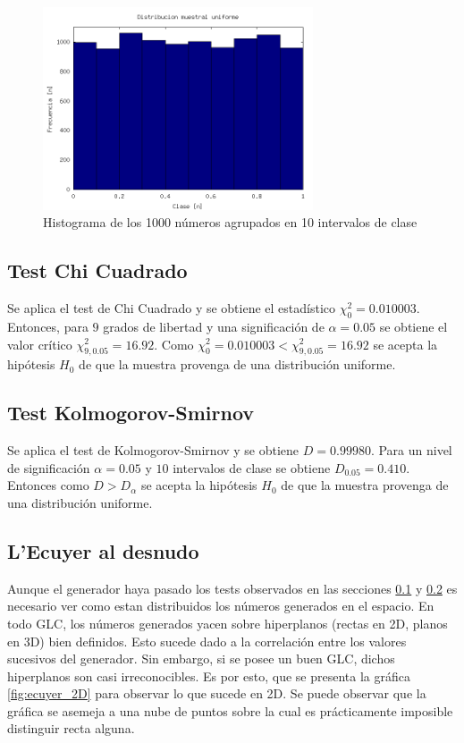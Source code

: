 \documentclass{sig-alternate}
\begin{document}
\begin{figure}[ht]
\label{fig:histograma_ecuyer}
\includegraphics[width=8cm]{histograma_ecuyer}
\caption{Histograma de los 1000 n\'umeros agrupados en 10 intervalos de clase}
\end{figure}

\subsection{Test Chi Cuadrado}
\label{sec:chi}
Se aplica el test de Chi Cuadrado y se obtiene el estad\'istico $\chi_{0}^{2}=0.010003$.
Entonces, para $9$ grados de libertad y una significaci\'on de $\alpha=0.05$ se obtiene
el valor cr\'itico $\chi_{9,0.05}^{2}=16.92$.
Como $\chi_{0}^{2}=0.010003 < \chi_{9,0.05}^{2}=16.92$ se acepta la hip\'otesis $H_{0}$
de que la muestra provenga de una distribuci\'on uniforme.

\subsection{Test Kolmogorov-Smirnov}
\label{sec:kolmogorov}
Se aplica el test de Kolmogorov-Smirnov y se obtiene $D=0.99980$.
Para un nivel de significaci\'on $\alpha=0.05$ y $10$ intervalos de clase
se obtiene $D_{0.05}=0.410$. Entonces como $D > D_{\alpha}$
se acepta la hip\'otesis $H_{0}$ de que la muestra
provenga de una distribuci\'on uniforme.

\subsection{L'Ecuyer al desnudo}
Aunque el generador haya pasado los tests observados en las secciones \ref{sec:chi} y \ref{sec:kolmogorov}
es necesario ver como estan distribuidos los n\'umeros generados en el espacio. En todo GLC,
los n\'umeros generados yacen sobre hiperplanos (rectas en 2D, planos en 3D) bien definidos. Esto
sucede dado a la correlaci\'on entre los valores sucesivos del generador.
Sin embargo, si se posee un buen GLC, dichos hiperplanos son casi irreconocibles. Es por esto,
que se presenta la gr\'afica \ref{fig:ecuyer_2D} para observar lo que sucede en 2D.
Se puede observar que la gr\'afica se asemeja a una nube de puntos sobre la cual es
pr\'acticamente imposible distinguir recta alguna. \\
\end{document}
